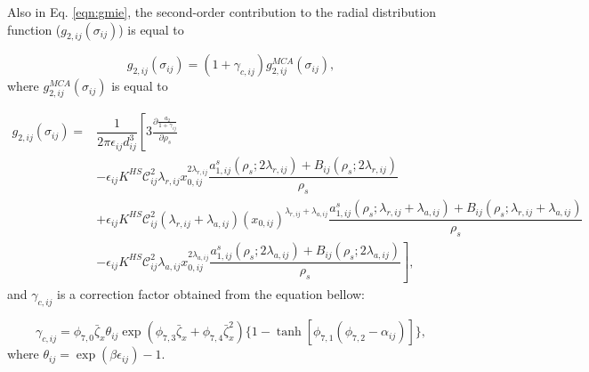 Also in Eq. \ref{eqn:gmie}, the second-order contribution to the radial distribution function ($g_{2,ij}(\sigma_{ij})$) is equal to

\begin{equation}
g_{2,ij}(\sigma_{ij}) = (1 + \gamma_{c,ij}) g_{2,ij}^{MCA}(\sigma_{ij}), 
\end{equation}
where $g_{2,ij}^{MCA}(\sigma_{ij})$ is equal to

\begin{equation}
\begin{aligned}
g_{2,ij}(\sigma_{ij}) {}=& \dfrac{1}{2 \pi \epsilon_{ij} d _{ij}^{3}} \left[3 \frac{\partial \frac{a_{2}}{1+\gamma_{ij}}}{\partial \rho _{s}} \right. \\
& \left. - \epsilon_{ij} K^{HS} \mathcal{C}_{ij}^{2} \lambda_{r,ij} x_{0,ij}^{2\lambda_{r,ij}} \dfrac{a_{1,ij}^{s}(\rho_{s};2\lambda_{r,ij})+B_{ij}(\rho_{s};2\lambda_{r,ij})}{\rho _{s}} \right. \\
& \left. + \epsilon_{ij} K^{HS} \mathcal{C}_{ij}^{2} (\lambda_{r,ij}+\lambda_{a,ij}) (x_{0,ij})^{\lambda_{r,ij}+\lambda_{a,ij}} \dfrac{a_{1,ij}^{s}(\rho_{s};\lambda_{r,ij}+\lambda_{a,ij})+B_{ij}(\rho_{s};\lambda_{r,ij}+\lambda_{a,ij})}{\rho _{s}} \right. \\
& \left. - \epsilon_{ij} K^{HS} \mathcal{C}_{ij}^{2} \lambda_{a,ij} x_{0,ij}^{2\lambda_{a,ij}} \dfrac{a_{1,ij}^{s}(\rho_{s};2\lambda_{a,ij})+B_{ij}(\rho_{s};2\lambda_{a,ij})}{\rho _{s}}\right],
\end{aligned}
\end{equation} 
and $\gamma_{c,ij}$ is a correction factor obtained from the equation bellow:

\begin{equation}
\gamma_{c,ij} = \phi_{7,0} \bar{\zeta}_{x} \theta_{ij} \exp(\phi_{7,3} \bar{\zeta}_{x} + \phi_{7,4} \bar{\zeta}_{x}^2) \lbrace 1-\tanh [\phi_{7,1}(\phi_{7,2} - \alpha _{ij})] \rbrace,
\end{equation}
where $\theta _{ij} = \exp (\beta \epsilon_{ij}) -1$.
